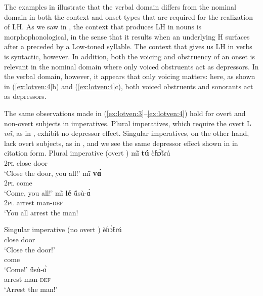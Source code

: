 \documentclass[output=paper,newtxmath,modfonts,nonflat,hidelinks]{langsci/langscibook}
\begin{document}
The examples in  illustrate that the verbal domain differs from the nominal domain in both the context and onset types that are required for the realization of LH. As we saw in , the context that produces LH  in nouns is morphophonological, in the sense that it results when an underlying H surfaces after a  preceded by a Low-toned syllable. The context that gives us LH in verbs is syntactic, however. In addition, both the voicing and obstruency of an onset is relevant in the nominal domain where only voiced obstruents act as depressors. In the verbal domain, however, it appears that only voicing matters: here, as shown in (\ref{ex:lotven:4}b) and (\ref{ex:lotven:4}c), both voiced obstruents and sonorants act as depressors.

The same observations made in (\ref{ex:lotven:3}–\ref{ex:lotven:4}) hold for overt and non-overt subjects in imperatives. Plural imperatives, which require the overt L   \textit{mĩ̀}, as in , exhibit no depressor effect. Singular imperatives, on the other hand, lack overt subjects, as in , and we see the same depressor effect shown in  in citation form. 
\ea\label{ex:lotven:5} Plural imperative (overt )
\ea\label{ex:lotven:5a}
    \gll mĩ̀ \textbf{tú} èɦɔ̃̀tɾú\\
    2\textsc{pl}  close door    \\
    \glt ‘Close the door, you all!’
\ex\label{ex:lotven:5b}
	\gll mĩ̀ \textbf{vɑ́} \\
    2\textsc{pl} come\\
    \glt ‘Come, you all!’
\ex\label{ex:lotven:5c}
	\gll mĩ̀ \textbf{lé} ṹsù-ɑ̀ \\
    2\textsc{pl}  arrest man-\textsc{def}\\
    \glt ‘You all arrest the man!
\z
\z
 
\ea\label{ex:lotven:6}Singular imperative (no overt )
\ea\label{ex:lotven:6a}
     èɦɔ̃̀tɾú\\
    close door    \\
    \glt ‘Close the door!’
\ex\label{ex:lotven:6b}
	\\
	come\\
    \glt ‘Come!’
\ex\label{ex:lotven:6c}
	 ṹsù-ɑ̀\\
    arrest man-\textsc{def}\\
    \glt ‘Arrest the man!’
\z
\z
\end{document}
